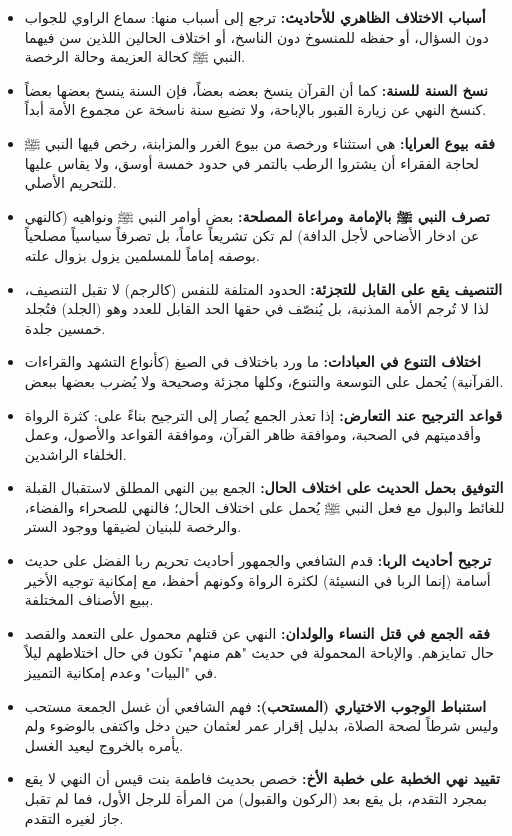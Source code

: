 \begin{itemize}
    \item \textbf{أسباب الاختلاف الظاهري للأحاديث:} ترجع إلى أسباب منها: سماع الراوي للجواب دون السؤال، أو حفظه للمنسوخ دون الناسخ، أو اختلاف الحالين اللذين سن فيهما النبي ﷺ كحالة العزيمة وحالة الرخصة.
    \item \textbf{نسخ السنة للسنة:} كما أن القرآن ينسخ بعضه بعضاً، فإن السنة ينسخ بعضها بعضاً كنسخ النهي عن زيارة القبور بالإباحة، ولا تضيع سنة ناسخة عن مجموع الأمة أبداً.
    \item \textbf{فقه بيوع العرايا:} هي استثناء ورخصة من بيوع الغرر والمزابنة، رخص فيها النبي ﷺ لحاجة الفقراء أن يشتروا الرطب بالتمر في حدود خمسة أوسق، ولا يقاس عليها للتحريم الأصلي.
    \item \textbf{تصرف النبي ﷺ بالإمامة ومراعاة المصلحة:} بعض أوامر النبي ﷺ ونواهيه (كالنهي عن ادخار الأضاحي لأجل الدافة) لم تكن تشريعاً عاماً، بل تصرفاً سياسياً مصلحياً بوصفه إماماً للمسلمين يزول بزوال علته.
    \item \textbf{التنصيف يقع على القابل للتجزئة:} الحدود المتلفة للنفس (كالرجم) لا تقبل التنصيف، لذا لا تُرجم الأمة المذنبة، بل يُنصّف في حقها الحد القابل للعدد وهو (الجلد) فتُجلد خمسين جلدة.
    \item \textbf{اختلاف التنوع في العبادات:} ما ورد باختلاف في الصيغ (كأنواع التشهد والقراءات القرآنية) يُحمل على التوسعة والتنوع، وكلها مجزئة وصحيحة ولا يُضرب بعضها ببعض.
    \item \textbf{قواعد الترجيح عند التعارض:} إذا تعذر الجمع يُصار إلى الترجيح بناءً على: كثرة الرواة وأقدميتهم في الصحبة، وموافقة ظاهر القرآن، وموافقة القواعد والأصول، وعمل الخلفاء الراشدين.
    \item \textbf{التوفيق بحمل الحديث على اختلاف الحال:} الجمع بين النهي المطلق لاستقبال القبلة للغائط والبول مع فعل النبي ﷺ يُحمل على اختلاف الحال؛ فالنهي للصحراء والفضاء، والرخصة للبنيان لضيقها ووجود الستر.
    \item \textbf{ترجيح أحاديث الربا:} قدم الشافعي والجمهور أحاديث تحريم ربا الفضل على حديث أسامة (إنما الربا في النسيئة) لكثرة الرواة وكونهم أحفظ، مع إمكانية توجيه الأخير ببيع الأصناف المختلفة.
    \item \textbf{فقه الجمع في قتل النساء والولدان:} النهي عن قتلهم محمول على التعمد والقصد حال تمايزهم. والإباحة المحمولة في حديث "هم منهم" تكون في حال اختلاطهم ليلاً في "البيات" وعدم إمكانية التمييز.
    \item \textbf{استنباط الوجوب الاختياري (المستحب):} فهم الشافعي أن غسل الجمعة مستحب وليس شرطاً لصحة الصلاة، بدليل إقرار عمر لعثمان حين دخل واكتفى بالوضوء ولم يأمره بالخروج ليعيد الغسل.
    \item \textbf{تقييد نهي الخطبة على خطبة الأخ:} خصص بحديث فاطمة بنت قيس أن النهي لا يقع بمجرد التقدم، بل يقع بعد (الركون والقبول) من المرأة للرجل الأول، فما لم تقبل جاز لغيره التقدم.

\end{itemize}
